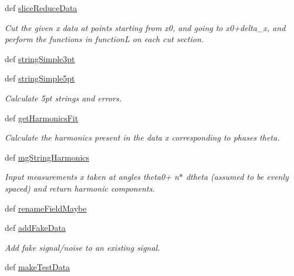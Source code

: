 \begin{DoxyCompactItemize}
def \hyperlink{namespacerepo_1_1programs_1_1pythonpackages_1_1pr_1_1SPfuncs_afac5173c60ef10bac3b5eafb40f7efef}{slice\-Reduce\-Data}
\begin{DoxyCompactList}\small\item\em Cut the given x data at points starting from x0, and going to x0+delta\-\_\-x, and perform the functions in function\-L on each cut section. \end{DoxyCompactList}\item 
def \hyperlink{namespacerepo_1_1programs_1_1pythonpackages_1_1pr_1_1SPfuncs_a7fb1286952274a8a185975238894be9d}{string\-Simple3pt}
\item 
def \hyperlink{namespacerepo_1_1programs_1_1pythonpackages_1_1pr_1_1SPfuncs_a26157a1627869c31bfa6e494e5caf311}{string\-Simple5pt}
\begin{DoxyCompactList}\small\item\em Calculate 5pt strings and errors. \end{DoxyCompactList}\item 
def \hyperlink{namespacerepo_1_1programs_1_1pythonpackages_1_1pr_1_1SPfuncs_a7590e0785adc48ccbabea8d0eccda514}{get\-Harmonics\-Fit}
\begin{DoxyCompactList}\small\item\em Calculate the harmonics present in the data x corresponding to phases theta. \end{DoxyCompactList}\item 
def \hyperlink{namespacerepo_1_1programs_1_1pythonpackages_1_1pr_1_1SPfuncs_a154be474c56db17750f8232efe410d54}{mg\-String\-Harmonics}
\begin{DoxyCompactList}\small\item\em Input measurements x taken at angles theta0+ n$\ast$ dtheta (assumed to be evenly spaced) and return harmonic components. \end{DoxyCompactList}\item 
def \hyperlink{namespacerepo_1_1programs_1_1pythonpackages_1_1pr_1_1SPfuncs_acb6d178d4325b6c3d8fec4f8197d6819}{rename\-Field\-Maybe}
\item 
def \hyperlink{namespacerepo_1_1programs_1_1pythonpackages_1_1pr_1_1SPfuncs_a9cc828a26b8f8d72c9c5c86bd951f8e8}{add\-Fake\-Data}
\begin{DoxyCompactList}\small\item\em Add fake signal/noise to an existing signal. \end{DoxyCompactList}\item 
def \hyperlink{namespacerepo_1_1programs_1_1pythonpackages_1_1pr_1_1SPfuncs_ae90ba18ae292290722e197cf242d8721}{make\-Test\-Data}

\end{DoxyCompactItemize}
